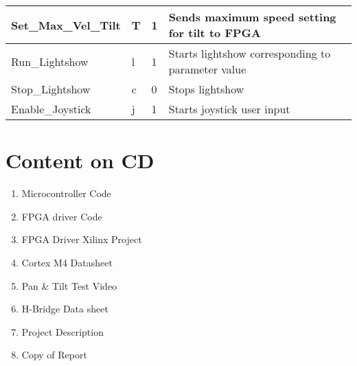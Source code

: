 \begin{table}[h]
\begin{tabular}{ | l | l | l | p{5cm} |}
     Set\_Max\_Vel\_Tilt & T & 1 & Sends maximum speed setting for tilt to FPGA \\
    \hline
    
     Run\_Lightshow & l & 1 & Starts lightshow corresponding to parameter value \\
    \hline
    
     Stop\_Lightshow & c & 0 & Stops lightshow \\
    \hline
    
    Enable\_Joystick & j & 1 & Starts joystick user input \\
    \hline
    \end{tabular}
    
\end{table}

\section{Content on CD}
\label{sec:ContentonCD}

\begin{enumerate}[noitemsep]
	\item Microcontroller Code
	
	\item FPGA driver Code
	
	\item FPGA Driver Xilinx Project
	
	\item Cortex M4 Datasheet
	
	\item Pan \& Tilt Test Video
	
	\item H-Bridge Data sheet
	
	\item Project Description
	
	\item Copy of Report
	
\end{enumerate}







